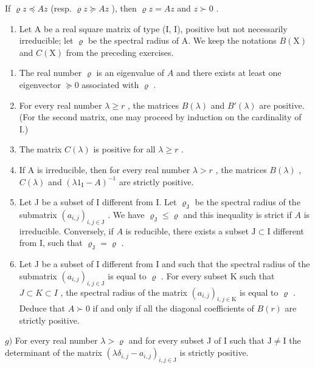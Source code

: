 If \(\varrho z \preccurlyeq Az\) (resp. \(\varrho z \succcurlyeq Az\) ), then \(\varrho z = Az\) and \(z \succ 0\) .

\begin{enumerate}
\def\labelenumi{\arabic{enumi})}
\setcounter{enumi}{19}
\tightlist
\item
  Let A be a real square matrix of type (I, I), positive but not necessarily irreducible; let \(\varrho\) be the spectral radius of A. We keep the notations \(B(\mathrm{X})\) and \(C(\mathrm{X})\) from the preceding exercises.
\end{enumerate}

\begin{enumerate}
\def\labelenumi{\alph{enumi})}
\item
  The real number \(\varrho\) is an eigenvalue of \(A\) and there exists at least one eigenvector \(\succcurlyeq 0\) associated with \(\varrho\) .
\item
  For every real number \(\lambda \geqslant r\) , the matrices \(B(\lambda)\) and \(B'(\lambda)\) are positive. (For the second matrix, one may proceed by induction on the cardinality of I.)
\item
  The matrix \(C(\lambda)\) is positive for all \(\lambda \geqslant r\) .
\item
  If A is irreducible, then for every real number \(\lambda > r\) , the matrices \(B(\lambda)\) , \(C(\lambda)\) and \((\lambda1_{\mathrm{I}} - A)^{-1}\) are strictly positive.
\item
  Let J be a subset of I different from I. Let \(\varrho_{\mathrm{J}}\) be the spectral radius of the submatrix \((a_{i,j})_{i,j\in \mathrm{J}}\) . We have \(\varrho_{\mathrm{J}}\leqslant \varrho\) and this inequality is strict if \(A\) is irreducible. Conversely, if \(A\) is reducible, there exists a subset \(\mathrm{J}\subset \mathrm{I}\) different from I, such that \(\varrho_{\mathrm{J}} = \varrho\) .
\item
  Let J be a subset of I different from I and such that the spectral radius of the submatrix \((a_{i,j})_{i,j\in\mathrm{J}}\) is equal to \(\varrho\) . For every subset K such that \(J\subset K\subset I\) , the spectral radius of the matrix \((a_{i,j})_{i,j\in\mathrm{K}}\) is equal to \(\varrho\) . Deduce that \(A\succ0\) if and only if all the diagonal coefficients of \(B(r)\) are strictly positive.
\end{enumerate}

\(g)\) For every real number \(\lambda >\varrho\) and for every subset J of I such that \(\mathrm{J}\neq \mathrm{I}\) the determinant of the matrix \((\lambda \delta_{i,j} - a_{i,j})_{i,j\in \mathrm{J}}\) is strictly positive.

